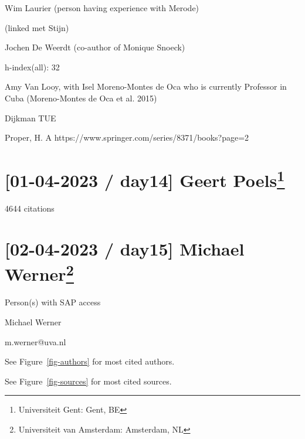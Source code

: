 \documentclass[
  letterpaper,
  DIV=11,
  numbers=noendperiod]{scrreprt}
\begin{document}
Wim Laurier (person having experience with Merode)


(linked met Stijn)

Jochen De Weerdt (co-author of Monique Snoeck)


h-index(all): 32

Amy Van
Looy,
with Isel Moreno-Montes de
Oca
who is currently Professor in Cuba (Moreno-Montes de Oca et al. 2015)

Dijkman
TUE

Proper, H. A https://www.springer.com/series/8371/books?page=2

\hypertarget{day14-geert-poels4}{%
\section[{[}01-04-2023 / day14{]} Geert
Poels]{\texorpdfstring{{[}01-04-2023 / day14{]} Geert
Poels\footnote{Universiteit Gent: Gent, BE}}{{[}01-04-2023 / day14{]} Geert Poels}}\label{day14-geert-poels4}}


4644 citations

\hypertarget{day15-michael-werner5}{%
\section[{[}02-04-2023 / day15{]} Michael
Werner]{\texorpdfstring{{[}02-04-2023 / day15{]} Michael
Werner\footnote{Universiteit van Amsterdam: Amsterdam, NL}}{{[}02-04-2023 / day15{]} Michael Werner}}\label{day15-michael-werner5}}

Person(s) with SAP access


Michael Werner

m.werner@uva.nl

See Figure~\ref{fig-authors} for most cited authors.

See Figure~\ref{fig-sources} for most cited sources.
\end{document}
